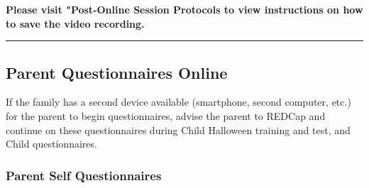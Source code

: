 \documentclass[]{book}
\begin{document}
\textbf{Please visit "Post-Online Session Protocols to view instructions on how to save the video recording.}

\begin{center}\rule{0.5\linewidth}{0.5pt}\end{center}

\hypertarget{parent-questionnaires-online}{%
\subsection{Parent Questionnaires Online}\label{parent-questionnaires-online}}

If the family has a second device available (smartphone, second computer, etc.) for the parent to begin questionnaires, advise the parent to REDCap and continue on these questionnaires during Child Halloween training and test, and Child questionnaires.

\hypertarget{parent-self-questionnaires}{%
\subsubsection{Parent Self Questionnaires}\label{parent-self-questionnaires}}
\end{document}
